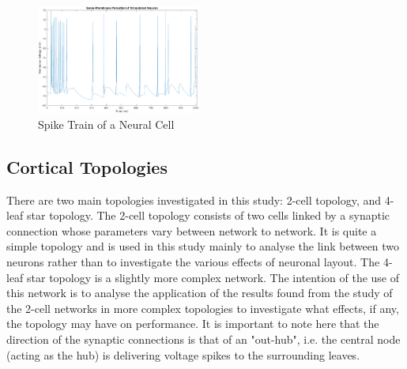 \documentclass[letterpaper, 10 pt, conference]{ieeeconf}  %
\begin{document}
\begin{figure}[ht]
    \centering
    \includegraphics[width=0.48\textwidth]{sampleSpikeTrain.png}
    \caption{Spike Train of a Neural Cell}
    \label{image:sampleSpike}
\end{figure}
\subsection*{Cortical Topologies}
There are two main topologies investigated in this study: 2-cell topology, and 4-leaf star topology. The 2-cell topology consists of two cells linked by a synaptic connection whose parameters vary between network to network. It is quite a simple topology and is used in this study mainly to analyse the link between two neurons rather than to investigate the various effects of neuronal layout. The 4-leaf star topology is a slightly more complex network. The intention of the use of this network is to analyse the application of the results found from the study of the 2-cell networks in more complex topologies to investigate what effects, if any, the topology may have on performance. It is important to note here that the direction of the synaptic connections is that of an "out-hub", i.e. the central node (acting as the hub) is delivering voltage spikes to the surrounding leaves.
\end{document}
